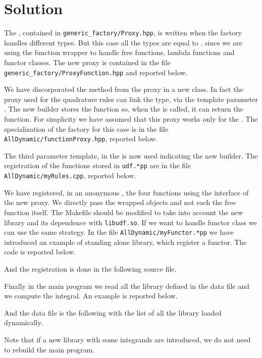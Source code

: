 \section*{Solution}

The , contained in \texttt{generic\_factory/Proxy.hpp},
is written when the factory handles different types.
But this case all the types are equal to , since we are using the function wrapper to handle free functions, lambda
functions and functor classes. The new proxy is contained in the file
\texttt{generic\_factory/ProxyFunction.hpp} and reported below.
\lstset{basicstyle=\scriptsize\sf}

\lstset{basicstyle=\sf}
We have discorporated the  method  from the proxy in a
new class. In fact the proxy used for the quadrature rules can link the type,
via the template parameter . The new builder stores the
function so, when the  is called, it can return the function.
For simplicity we have assumed that this proxy works only for the . The specialization of the factory for this case is in the file
\texttt{AllDynamic/functionProxy.hpp}, reported below.
\lstset{basicstyle=\scriptsize\sf}

\lstset{basicstyle=\sf}
The third parameter template, in the  is now used indicating
the new builder.  The registration of the functions stored in \texttt{udf.*pp}
are
in the file \texttt{AllDynamic/myRules.cpp}, reported below.
\lstset{basicstyle=\scriptsize\sf}

\lstset{basicstyle=\sf}
We have registered, in an anonymous , the four functions using
the interface of the new proxy. We directly pass the wrapped objects and not
each the free function itself. The Makefile should be modified to take into
account the new library and its dependence with \texttt{libudf.so}.
If we want to handle functor class we can use the same strategy. In the file
\texttt{AllDynamic/myFunctor.*pp} we have introduced an example of standing
alone library, which register a functor. The code is reported below.
\lstset{basicstyle=\scriptsize\sf}

\lstset{basicstyle=\sf}
And the registration is done in the following source file.
\lstset{basicstyle=\scriptsize\sf}

\lstset{basicstyle=\sf}
Finally in the main program we read all the library defined in the data file
and we compute the integral. An example is reported below.
\lstset{basicstyle=\scriptsize\sf}

\lstset{basicstyle=\sf}
And the data file is the following with the list of all the library loaded
dynamically.
\lstset{basicstyle=\scriptsize\sf}

\lstset{basicstyle=\sf}
Note that if a new library with some integrands are introduced, we do not need
to rebuild the main program.
